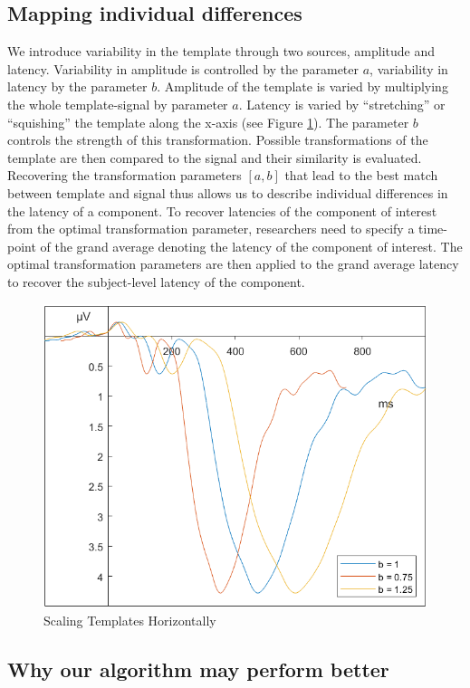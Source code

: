\documentclass[
  man]{apa7}
\begin{document}
\hypertarget{mapping-individual-differences}{%
\subsection{Mapping individual differences}\label{mapping-individual-differences}}

We introduce variability in the template through two sources, amplitude and latency. Variability in amplitude is controlled by the parameter \(a\), variability in latency by the parameter \(b\). Amplitude of the template is varied by multiplying the whole template-signal by parameter \(a\). Latency is varied by ``stretching'' or ``squishing'' the template along the x-axis (see Figure \ref{fig:b-scale-example}). The parameter \(b\) controls the strength of this transformation. Possible transformations of the template are then compared to the signal and their similarity is evaluated. Recovering the transformation parameters \([a, b]\) that lead to the best match between template and signal thus allows us to describe individual differences in the latency of a component. To recover latencies of the component of interest from the optimal transformation parameter, researchers need to specify a time-point of the grand average denoting the latency of the component of interest. The optimal transformation parameters are then applied to the grand average latency to recover the subject-level latency of the component.



\begin{figure}
\includegraphics[width=0.75\linewidth]{images/b_scale} \caption{Scaling Templates Horizontally}\label{fig:b-scale-example}
\end{figure}

\hypertarget{why-our-algorithm-may-perform-better}{%
\subsection{Why our algorithm may perform better}\label{why-our-algorithm-may-perform-better}}
\end{document}

